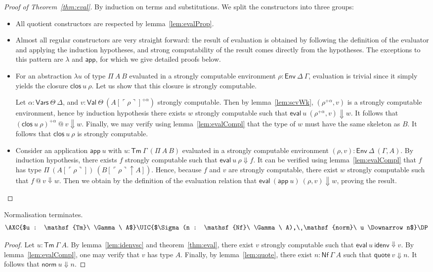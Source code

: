 \documentclass[a4paper,english]{lipics-v2019}
\newcommand{\agdaSymb}[1]{\mathsf{#1}}
\newcommand{\Tm}{\agdaSymb{Tm}}
\newcommand{\app}{\agdaSymb{app}}
\newcommand{\lam}{\lambda}
\newcommand{\Vars}{\agdaSymb{Vars}}
\newcommand{\Val}{\agdaSymb{Val}}
\newcommand{\Env}{\agdaSymb{Env}}
\newcommand{\clos}{\agdaSymb{clos}}
\newcommand{\idenv}{\agdaSymb{idenv}}
\newcommand{\Nf}{\agdaSymb{Nf}}
\newcommand{\eval}{\agdaSymb{eval}}
\newcommand{\q}{\agdaSymb{quote}}
\newcommand{\norm}{\agdaSymb{norm}}
\newcommand{\cul}{\ulcorner}
\newcommand{\cur}{\urcorner}
\newcommand{\Da}{\Downarrow}
\begin{document}
\begin{proof}[Proof of Theorem~\ref{thm:eval}]
  By induction on terms and substitutions. We split the constructors into three
  groups:
  \begin{itemize}
  \item All quotient constructors are respected by lemma~\ref{lem:evalProp}.
  \item Almost all regular constructors are very straight forward: the result of
    evaluation is obtained by following the definition of the evaluator and
    applying the induction hypotheses, and strong computability of the result
    comes directly from the hypotheses. The exceptions to this pattern are $\lam$
    and $\app$, for which we give detailed proofs below.
  \item For an abstraction $\lam u$ of type $\Pi\ A\ B$ evaluated in a strongly
    computable environment $\rho : \Env\ \Delta\ \Gamma$, evaluation is trivial
    since it simply yields the closure $\clos\ u\ \rho$. Let us show that this
    closure is strongly computable.

    Let $\alpha : \Vars\ \Theta\ \Delta$, and $v : \Val\ \Theta\ (A[\cul \rho \cur]^{+\alpha})$
    strongly computable. Then by lemma~\ref{lem:scvWk}, $(\rho^{+\alpha},v)$ is
    a strongly computable environment, hence by induction hypothesis there exists
    $w$ strongly computable such that $\eval\ u\ (\rho^{+\alpha},v) \Da w$.
    It follows that $(\clos\ u\ \rho)^{+\alpha}\ @\ v \Da w$. Finally, we
    may verify using lemma~\ref{lem:evalCompl} that the type of $w$ must have
    the same skeleton as $B$. It follows that $\clos\ u\ \rho$ is strongly
    computable.
  \item Consider an application $\app\ u$ with $u : \Tm\ \Gamma\ (\Pi\ A\ B)$
    evaluated in a strongly computable environment $(\rho,v) : \Env\ \Delta\ (\Gamma,A)$.
    By induction hypothesis, there exists $f$ strongly computable such that
    $\eval\ u\ \rho \Da f$. It can be verified using lemma~\ref{lem:evalCompl}
    that $f$ has type $\Pi\ (A[\cul \rho \cur])\ (B[\cul \rho \cur \uparrow A])$.
    Hence, because $f$ and $v$ are strongly computable, there exist $w$ strongly
    computable such that $f\ @\ v \Da w$. Then we obtain by the definition of
    the evaluation relation that $\eval\ (\app\ u)\ (\rho,v) \Da w$, proving
    the result.
  \end{itemize}
\end{proof}

\begin{proposition}[Termination]
  \label{prop:termination}
  Normalisation terminates.
  \[ \AXC{$u : \Tm\ \Gamma\ A$}\UIC{$\Sigma(n : \Nf\ \Gamma\ A),\ \norm\ u \Da n$}\DP \]
\end{proposition}
\begin{proof}
  Let $u : \Tm\ \Gamma\ A$. By lemma~\ref{lem:idenvsc} and theorem~\ref{thm:eval},
  there exist $v$ strongly computable such that $\eval\ u\ \idenv \Da v$.
  By lemma~\ref{lem:evalCompl}, one may verify that $v$ has type $A$.
  Finally, by lemma~\ref{lem:quote}, there exist $n : \Nf\ \Gamma\ A$ such that
  $\q\ v \Da n$. It follows that $\norm\ u \Da n$.
\end{proof}
\end{document}
